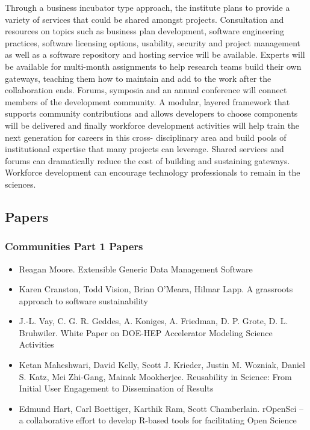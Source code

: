 \documentclass[11pt, oneside]{amsart}
\begin{document}
Through a business incubator type approach, the institute plans to provide a variety of services that could be shared amongst
projects. Consultation and resources on topics such as business plan development, software engineering practices, 
software licensing options, usability, security and project management as well as a software repository and hosting 
service will be available. Experts will be available for multi-month assignments to help research teams build their own gateways,
teaching them how to maintain and add to the work after the collaboration ends. Forums, symposia and an annual conference
will connect members of the development community. A modular, layered framework that supports community contributions and 
allows developers to choose components will be delivered and finally 
workforce development activities will help train the next generation for careers in this cross- disciplinary area and 
build pools of institutional expertise that many projects can leverage. Shared services and forums can dramatically reduce the cost
of building and sustaining gateways. Workforce development can encourage technology professionals to remain in the sciences.


\subsection{Papers}

\subsubsection*{Communities Part 1 Papers}

\begin{itemize}

\item Reagan Moore. Extensible Generic Data Management Software
  \cite{Moore_WSSSPE}

\item Karen Cranston, Todd Vision, Brian O'Meara, Hilmar Lapp. A
  grassroots approach to software sustainability
  \cite{Cranston_WSSSPE}

\item J.-L. Vay, C. G. R. Geddes, A. Koniges, A. Friedman,
  D. P. Grote, D. L. Bruhwiler. White Paper on DOE-HEP Accelerator
  Modeling Science Activities \cite{Vay_WSSSPE}

\item Ketan Maheshwari, David Kelly, Scott J. Krieder, Justin M. Wozniak, Daniel S. Katz, Mei Zhi-Gang, Mainak Mookherjee. Reusability in Science: From Initial User Engagement to Dissemination of Results \cite{Maheshwari_WSSSPE}

\item Edmund Hart, Carl Boettiger, Karthik Ram, Scott Chamberlain. rOpenSci -- a collaborative effort to develop R-based tools for facilitating Open Science \cite{Hart_WSSSPE}

\end{itemize}
\end{document}
